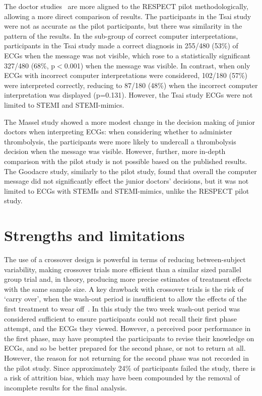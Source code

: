 The doctor studies~\citep{goodacre_computer_2001,massel_observer_2003,tsai_computer_2003} are more aligned to the RESPECT pilot methodologically, allowing a more direct comparison of results. The participants in the Tsai study were not as accurate as the pilot participants, but there was similarity in the pattern of the results. In the sub-group of correct computer interpretations, participants in the Tsai study made a correct diagnosis in 255\slash 480 (53\%) of ECGs when the message was not visible, which rose to a statistically significant 327\slash 480 (68\%, p$<$0.001) when the message was visible. In contrast, when only ECGs with incorrect computer interpretations were considered, 102\slash 180 (57\%) were interpreted correctly, reducing to 87\slash 180 (48\%) when the incorrect computer interpretation was displayed (p=0.131). However, the Tsai study ECGs were not limited to STEMI and STEMI-mimics.

The Massel study showed a more modest change in the decision making of junior doctors when interpreting ECGs: when considering whether to administer thrombolysis, the participants were more likely to undercall a thrombolysis decision when the message was visible. However, further, more in-depth comparison with the pilot study is not possible based on the published results. The Goodacre study, similarly to the pilot study, found that overall the computer message did not significantly effect the junior doctors' decisions, but it was not limited to ECGs with STEMIs and STEMI-mimics, unlike the RESPECT pilot study.

\section{Strengths and limitations}
\label{strengthsandlimitations}

The use of a crossover design is powerful in terms of reducing between-subject variability, making crossover trials more efficient than a similar sized parallel group trial and, in theory, producing more precise estimates of treatment effects with the same sample size. A key drawback with crossover trials is the risk of `carry over', when the wash-out period is insufficient to allow the effects of the first treatment to wear off~\citep{mills_design_2009,sibbald_understanding_1998}. In this study the two week wash-out period was considered sufficient to ensure participants could not recall their first phase attempt, and the ECGs they viewed. However, a perceived poor performance in the first phase, may have prompted the participants to revise their knowledge on ECGs, and so be better prepared for the second phase, or not to return at all. However, the reason for not returning for the second phase was not recorded in the pilot study. Since approximately 24\% of participants failed the study, there is a risk of attrition bias, which may have been compounded by the removal of incomplete results for the final analysis. 

